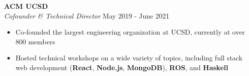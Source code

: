 \documentclass[a4paper]{article}
\newcommand{\lineunder} {
    \vspace*{-8pt} \\
    \hspace*{-18pt} \hrulefill \\
}
\newcommand{\header} [1] {
    {\hspace*{-18pt}\vspace*{6pt} \textsc{#1}}
    \vspace*{-6pt} \lineunder
}
\newenvironment{entry}[4][]{
  \textbf{#2} \hfill #1 \\
  \textit{#3} \hfill #4 \\
  \vspace{-2mm}
  \begin{itemize} \itemsep 0em
  }
  {
  \end{itemize}
}
\begin{document}
\begin{entry}{ACM UCSD}{Cofounder \& Technical Director}{May 2019 - June 2021}
  \item Co-founded the largest engineering organization at UCSD, currently at over 800 members
  \item Hosted technical workshops on a wide variety of topics, including full
    stack web development (\textbf{React}, \textbf{Node.js}, \textbf{MongoDB}), \textbf{ROS}, and \textbf{Haskell}
\end{entry}



\begin{comment}
\header{Favorite Video Games}
Street Fighter 6, Tears of the Kingdom, Hollow Knight, Celeste
\end{comment}
\ 
\end{document}
